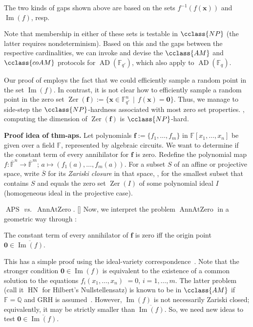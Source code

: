 \documentclass{toc}
\newcommand{\F}{\mathbb{F}}
\DeclareMathOperator{\im}{\mathrm{Im}}
\DeclareMathOperator{\zer}{\mathrm{Zer}}
\newcommand{\ol}[1]{\overline{#1}}
\newcommand{\NP}{\cclass{NP}\xspace}  %
\newcommand{\AM}{\cclass{AM}\xspace}  %
\newcommand{\coAM}{\cclass{coAM}\xspace}  %
\DeclareMathOperator{\AD}{\mathrm{AD}\xspace} %
\DeclareMathOperator{\APS}{\mathrm{APS}\xspace} %
\DeclareMathOperator{\AnnAtZero}{\mathrm{AnnAtZero}\xspace} %
\DeclareMathOperator{\HN}{\mathrm{HN}\xspace} %
\begin{document}
The two kinds of gaps shown above are based on the
%
sets   %
%
$f^{-1}(f(\mathbf x))$
%
and $\im(f)$, resp.   %

Note that membership in either of these sets is testable in $\NP$ (the latter requires nondeterminism). Based on this and the gaps between the respective cardinalities, we can invoke  and devise the
$\AM$ and $\coAM$ protocols for
%
$\AD(\F_{q'})$,    %
which also apply to
%
$\AD(\F_q)$.    %

%
\begin{remark}   %
%
Our proof of  employs the fact that we could efficiently sample %
a random point in the set $\im(f)$. In contrast, it is not clear how to 
efficiently %
sample a random point in the zero set $\zer(\mathbf f):= \{\mathbf x\in \F_{q'}^n \,\mid\, f(\mathbf x)= \mathbf 0\}$. Thus, we manage to side-step the $\NP$-hardness associated with most zero set properties. \Eg, computing the dimension of $\zer(\mathbf f)$ is $\NP$-hard.
\end{remark}
  
\smallskip\noindent
\textbf{Proof idea of  {thm-aps}.} 
Let polynomials 
%
$\mathbf f:= \{f_1,\dots,f_m\}$ in $\F[x_1,\dots,x_n]$ be given over a field $\F$,
represented by algebraic circuits. %
We want to determine if the constant term of every annihilator for $\mathbf f$ is zero. Redefine the polynomial map $f:\ol{\F}^n\to \ol{\F}^m$; $a\mapsto (f_1(a),\dots,f_m(a))$. For a subset $S$ of an affine
%
or projective   %
space, write $\overline{S}$ for its \emph{Zariski closure} in that space, \ie,
%
for  %
the smallest subset that contains $S$ and equals the zero set $\zer(I)$ of some polynomial %
ideal $I$ (homogeneous ideal in the projective case).  %

\emph{$\APS$ vs.\ $\AnnAtZero$.} [] Now, we interpret the problem $\AnnAtZero$ in a geometric way through :

 The constant term of every annihilator of $\mathbf f$ is zero iff the origin point $\mathbf 0\in \ol{\im(f)}$. 
 
This has a simple proof using the ideal-variety correspondence~\cite{Har92}. Note that the stronger condition $\mathbf 0\in\im(f)$ is equivalent to the existence of a common solution to the equations $f_i(x_1,\dots,x_n)$ $=0$, $i=1,\dots,m$. The latter problem (call it 
%
$\HN$ %
for Hilbert's Nullstellensatz) is known to be in $\AM$ if  $\F=\mathbb{Q}$ and GRH is assumed~\cite{koiran1996hilbert}.
However, $\im(f)$ is not necessarily Zariski closed; equivalently, it may be strictly smaller than $\ol{\im(f)}$. So, we need new ideas to test $\mathbf{0}\in \overline{\im(f)}$. 
  
\end{document}
